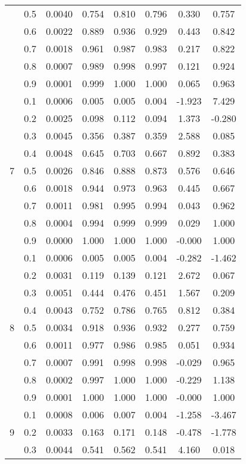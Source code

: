 \documentclass[11pt,a4paper]{report}
\begin{document}
\begin{longtable}{ | c | c || c | c | c | c | c | c | }
 & 0.5 & 0.0040 & 0.754 & 0.810 & 0.796 & 0.330 & 0.757 \\
 & 0.6 & 0.0022 & 0.889 & 0.936 & 0.929 & 0.443 & 0.842 \\
 & 0.7 & 0.0018 & 0.961 & 0.987 & 0.983 & 0.217 & 0.822 \\
 & 0.8 & 0.0007 & 0.989 & 0.998 & 0.997 & 0.121 & 0.924 \\
 & 0.9 & 0.0001 & 0.999 & 1.000 & 1.000 & 0.065 & 0.963 \\
 \hline
\multirow{9}{*}{7} & 0.1 & 0.0006 & 0.005 & 0.005 & 0.004 & -1.923 & 7.429 \\
 & 0.2 & 0.0025 & 0.098 & 0.112 & 0.094 & 1.373 & -0.280 \\
 & 0.3 & 0.0045 & 0.356 & 0.387 & 0.359 & 2.588 & 0.085 \\
 & 0.4 & 0.0048 & 0.645 & 0.703 & 0.667 & 0.892 & 0.383 \\
 & 0.5 & 0.0026 & 0.846 & 0.888 & 0.873 & 0.576 & 0.646 \\
 & 0.6 & 0.0018 & 0.944 & 0.973 & 0.963 & 0.445 & 0.667 \\
 & 0.7 & 0.0011 & 0.981 & 0.995 & 0.994 & 0.043 & 0.962 \\
 & 0.8 & 0.0004 & 0.994 & 0.999 & 0.999 & 0.029 & 1.000 \\
 & 0.9 & 0.0000 & 1.000 & 1.000 & 1.000 & -0.000 & 1.000 \\
 \hline
\multirow{9}{*}{8} & 0.1 & 0.0006 & 0.005 & 0.005 & 0.004 & -0.282 & -1.462 \\
 & 0.2 & 0.0031 & 0.119 & 0.139 & 0.121 & 2.672 & 0.067 \\
 & 0.3 & 0.0051 & 0.444 & 0.476 & 0.451 & 1.567 & 0.209 \\
 & 0.4 & 0.0043 & 0.752 & 0.786 & 0.765 & 0.812 & 0.384 \\
 & 0.5 & 0.0034 & 0.918 & 0.936 & 0.932 & 0.277 & 0.759 \\
 & 0.6 & 0.0011 & 0.977 & 0.986 & 0.985 & 0.051 & 0.934 \\
 & 0.7 & 0.0007 & 0.991 & 0.998 & 0.998 & -0.029 & 0.965 \\
 & 0.8 & 0.0002 & 0.997 & 1.000 & 1.000 & -0.229 & 1.138 \\
 & 0.9 & 0.0001 & 1.000 & 1.000 & 1.000 & -0.000 & 1.000 \\
 \hline
\multirow{9}{*}{9} & 0.1 & 0.0008 & 0.006 & 0.007 & 0.004 & -1.258 & -3.467 \\
 & 0.2 & 0.0033 & 0.163 & 0.171 & 0.148 & -0.478 & -1.778 \\
 & 0.3 & 0.0044 & 0.541 & 0.562 & 0.541 & 4.160 & 0.018 \\

\end{longtable}
\end{document}
